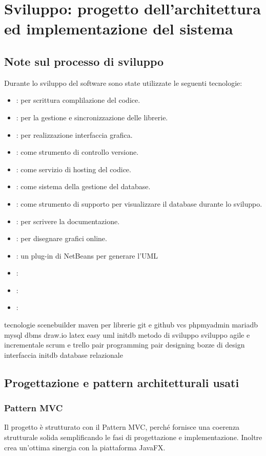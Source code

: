 \documentclass{article}
\begin{document}
\newpage
\section{Sviluppo: progetto dell'architettura ed implementazione del sistema}
\subsection{Note sul processo di sviluppo}
Durante lo sviluppo del software sono state utilizzate le seguenti tecnologie:
\begin{itemize}
    \item {: per scrittura complilazione del codice.}
    \item {: per la gestione e sincronizzazione delle librerie.}
    \item {: per realizzazione interfaccia grafica.}
    \item {: come strumento di controllo versione.}
    \item {: come servizio di hosting del codice.}
    \item {: come sistema della gestione del database.}
    \item {: come strumento di supporto per visualizzare il database durante lo sviluppo.}
    \item {: per scrivere la documentazione.}
    \item {: per disegnare grafici online.}
    \item {: un plug-in di NetBeans per generare l'UML}
    \item {\textb{}: }
    \item {\textb{}: }
    \item {\textb{}: }
\end{itemize}

tecnologie 
scenebuilder
maven per librerie
git e github vcs
phpmyadmin
mariadb
mysql dbms
draw.io
latex
easy uml
initdb
metodo di sviluppo
sviluppo agile e incrementale
scrum e trello
pair programming  
pair designing
bozze di design interfaccia
initdb
database relazionale



\subsection{Progettazione e pattern architetturali usati}
\subsubsection{Pattern MVC}
Il progetto è strutturato con il Pattern MVC, perché fornisce una coerenza strutturale solida
semplificando le fasi di progettazione e implementazione. Inoltre crea un'ottima sinergia con la
piattaforma JavaFX.
\end{document}
